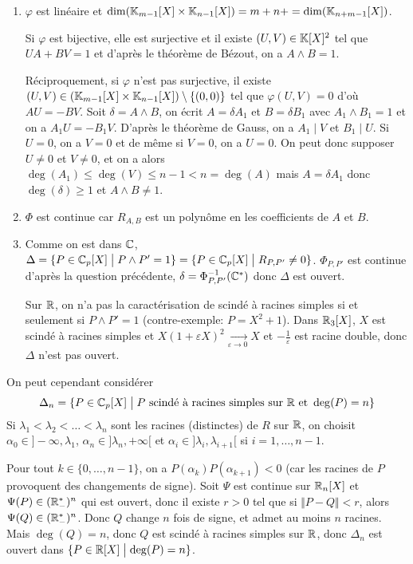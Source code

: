 \begin{solution}
	\phantom{}
	\begin{enumerate}
		\item $\varphi$ est linéaire et $\dim(\mathbb{K}_{m-1}[X]\times\mathbb{K}_{n-1}[X])=m+n+=\dim(\mathbb{K}_{n+m-1}[X])$.
		
		Si $\varphi$ est bijective, elle est surjective et il existe $(U,V)\in\mathbb{K}[X]^{2}$ tel que $UA+BV=1$ et d'après le théorème de Bézout, on a $A\wedge B=1$.

		Réciproquement, si $\varphi$ n'est pas surjective, il existe $(U,V)\in(\mathbb{K}_{m-1}[X]\times\mathbb{K}_{n-1}[X])\setminus\{(0,0)\}$ tel que $\varphi(U,V)=0$ d'où $AU=-BV$. Soit $\delta=A\wedge B$, on écrit $A=\delta A_{1}$ et $B=\delta B_{1}$ avec $A_{1}\wedge B_{1}=1$ et on a $A_{1}U=-B_{1}V$. D'après le théorème de Gauss, on a $A_{1}\mid V$ et $B_{1}\mid U$. Si $U=0$, on a $V=0$ et de même si $V=0$, on a $U=0$. On peut donc supposer $U\neq0$ et $V\neq 0$, et on a alors $\deg(A_{1})\leqslant\deg(V)\leqslant n-1<n=\deg(A)$ mais $A=\delta A_{1}$ donc $\deg(\delta)\geqslant1$ et $A\wedge B\neq 1$.

		\item $\Phi$ est continue car $R_{A,B}$ est un polynôme en les coefficients de $A$ et $B$.
		
		\item Comme on est dans $\mathbb{C}$, $\Delta=\{P\in\mathbb{C}_{p}[X]\bigm| P\wedge P'=1\}=\{P\in\mathbb{C}_p[X]\bigm| R_{P,P'}\neq0\}$. $\Phi_{P,P'}$ est continue d'après la question précédente, $\delta=\Phi_{P,P'}^{-1}(\mathbb{C}^{*})$ donc $\Delta$ est ouvert.
		
		Sur $\mathbb{R}$, on n'a pas la caractérisation de scindé à racines simples si et seulement si $P\wedge P'=1$ (contre-exemple: $P=X^{2}+1$). Dans $\mathbb{R}_{3}[X]$, $X$ est scindé à racines simples et $X(1+\varepsilon X)^{2}\xrightarrow[\varepsilon\to0]{}X$ et $-\frac{1}{\varepsilon}$ est racine double, donc $\Delta$ n'est pas ouvert.
	\end{enumerate}
\end{solution}

\begin{remark}
	On peut cependant considérer 
	$$\Delta_{n}=\{P\in\mathbb{C}_{p}[X]\bigm| P\text{ scindé à racines simples sur }\mathbb{R}\text{ et }\deg(P)=n\}$$
	Si $\lambda_{1}<\lambda_{2}<\dots<\lambda_{n}$ sont les racines (distinctes) de $R$ sur $\mathbb{R}$, on choisit $\alpha_{0}\in]-\infty,\lambda_{1}$, $\alpha_{n}\in]\lambda_{n},+\infty[$ et $\alpha_{i}\in]\lambda_{i},\lambda_{i+1}[$ si $i=1,\dots,n-1$. 

	Pour tout $k\in\{0,\dots,n-1\}$, on a $P(\alpha_{k})P(\alpha_{k+1})<0$ (car les racines de $P$ provoquent des changements de signe). Soit 
	$\Psi$ est continue sur $\mathbb{R}_{n}[X]$ et $\Psi(P)\in(\mathbb{R}_{-}^{*})^{n}$ qui est ouvert, donc il existe $r>0$ tel que si $\Vert P-Q\Vert<r$, alors $\Psi(Q)\in(\mathbb{R}_{-}^{*})^{n}$. Donc $Q$ change $n$ fois de signe, et admet au moins $n$ racines. Mais $\deg(Q)=n$, donc $Q$ est scindé à racines simples sur $\mathbb{R}$, donc $\Delta_{n}$ est ouvert dans $\{P\in\mathbb{R}[X]\bigm|\deg(P)=n\}$.
\end{remark}

